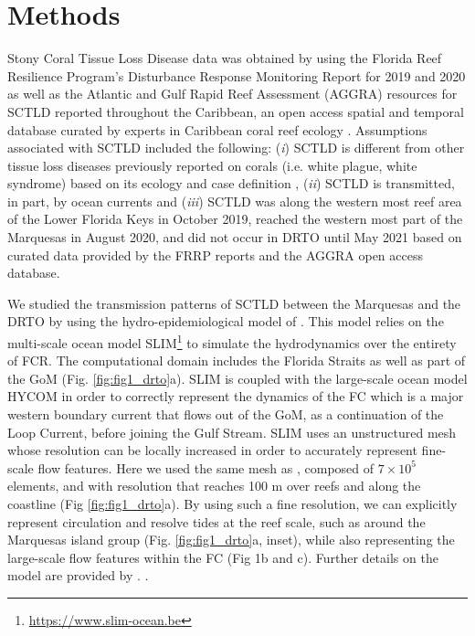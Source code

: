 \section{Methods}
Stony Coral Tissue Loss Disease data was obtained by using the Florida Reef Resilience Program's Disturbance Response Monitoring Report for 2019 and 2020 \citep{frrp2019,frrp2020} as well as the Atlantic and Gulf Rapid Reef Assessment (AGGRA) resources for SCTLD reported throughout the Caribbean, an open access spatial and temporal database curated by experts in Caribbean coral reef ecology \citep{kramer2019map}. Assumptions associated with SCTLD included the following: (\textit{i}) SCTLD is different from other tissue loss diseases previously reported on corals (i.e. white plague, white syndrome) based on its ecology and case definition \citep{noaa2018}, (\textit{ii}) SCTLD is transmitted, in part, by ocean currents \citep{aeby2019pathogenesis, muller2020spatial,eaton2021measuring} and (\textit{iii}) SCTLD was along the western most reef area of the Lower Florida Keys in October 2019, reached the western most part of the Marquesas in August 2020, and did not occur in DRTO until May 2021 based on curated data provided by the FRRP reports and the AGGRA open access database.

We studied the transmission patterns of SCTLD between the Marquesas and the DRTO by using the hydro-epidemiological model of \cite{dobbelaere2020coupled}. This model relies on the multi-scale ocean model SLIM\footnote{\url{ https://www.slim-ocean.be}} to simulate the hydrodynamics over the entirety of FCR. The computational domain includes the Florida Straits as well as part of the GoM (Fig. \ref{fig:fig1_drto}a). SLIM is coupled with the large-scale ocean model HYCOM in order to correctly represent the dynamics of the FC which is a major western boundary current that flows out of the GoM, as a continuation of the Loop Current, before joining the Gulf Stream. SLIM uses an unstructured mesh whose resolution can be locally increased in order to accurately represent fine-scale flow features. Here we used the same mesh as \cite{dobbelaere2020coupled}, composed of $7\times 10^5$ elements, and with resolution that reaches 100 m over reefs and along the coastline (Fig \ref{fig:fig1_drto}a). By using such a fine resolution, we can explicitly represent circulation and resolve tides at the reef scale, such as around the Marquesas island group (Fig. \ref{fig:fig1_drto}a, inset), while also representing the large-scale flow features within the FC (Fig 1b and c). Further details on the model are provided by \cite{frys2020fine}. .

